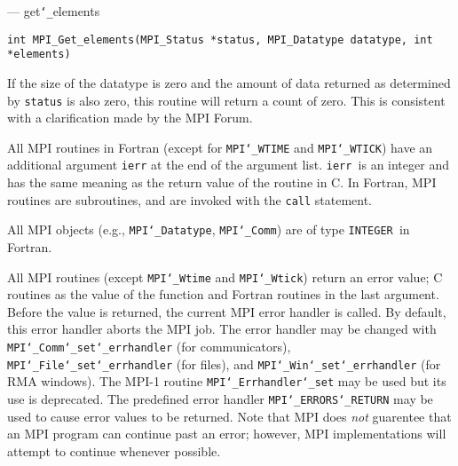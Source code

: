 \startmanpage
{}
--- get{\tt \char`\_}elements 
\startvb\begin{verbatim}
int MPI_Get_elements(MPI_Status *status, MPI_Datatype datatype, int *elements)

\end{verbatim}
\endvb

\par
{}
\par
If the size of the datatype is zero and the amount of data returned as
determined by {\tt status} is also zero, this routine will return a count of
zero.  This is consistent with a clarification made by the MPI Forum.
\par
{}
All MPI routines in Fortran (except for {\tt MPI{\tt \char`\_}WTIME} and {\tt MPI{\tt \char`\_}WTICK}) have
an additional argument {\tt ierr} at the end of the argument list.  {\tt ierr
}is an integer and has the same meaning as the return value of the routine
in C.  In Fortran, MPI routines are subroutines, and are invoked with the
{\tt call} statement.
\par
All MPI objects (e.g., {\tt MPI{\tt \char`\_}Datatype}, {\tt MPI{\tt \char`\_}Comm}) are of type {\tt INTEGER
}in Fortran.
\par
{}
\par
All MPI routines (except {\tt MPI{\tt \char`\_}Wtime} and {\tt MPI{\tt \char`\_}Wtick}) return an error value;
C routines as the value of the function and Fortran routines in the last
argument.  Before the value is returned, the current MPI error handler is
called.  By default, this error handler aborts the MPI job.  The error handler
may be changed with {\tt MPI{\tt \char`\_}Comm{\tt \char`\_}set{\tt \char`\_}errhandler} (for communicators),
{\tt MPI{\tt \char`\_}File{\tt \char`\_}set{\tt \char`\_}errhandler} (for files), and {\tt MPI{\tt \char`\_}Win{\tt \char`\_}set{\tt \char`\_}errhandler} (for
RMA windows).  The MPI-1 routine {\tt MPI{\tt \char`\_}Errhandler{\tt \char`\_}set} may be used but
its use is deprecated.  The predefined error handler
{\tt MPI{\tt \char`\_}ERRORS{\tt \char`\_}RETURN} may be used to cause error values to be returned.
Note that MPI does {\em not} guarentee that an MPI program can continue past
an error; however, MPI implementations will attempt to continue whenever
possible.
\par
{}
\endmanpage
